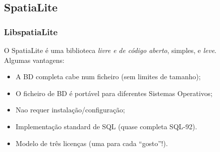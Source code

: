 \documentclass[hyperref={pdfpagelabels=true}]{beamer}
\begin{document}
\subsection{SpatiaLite}
\begin{frame}
\frametitle{LibspatiaLite}
O SpatiaLite \'{e} uma biblioteca \textit{livre e de c\'{o}digo aberto}, simples, e \textit{leve}.\\
Algumas vantagens:
    \begin{itemize}
      \item<2-> A BD completa cabe num ficheiro (sem limites de tamanho);
      \item<3-> O ficheiro de BD \'{e} port\'{a}vel para diferentes Sistemas Operativos;
      \item<4-> Nao requer instala\c{c}\~{a}o/configura\c{c}\~{a}o;
      \item<5-> Implementa\c{c}\~{a}o standard de SQL (quase completa SQL-92).      
      \item<6-> Modelo de tr\^{e}s licen\c{c}as (uma para cada ``gosto''!).      
    \end{itemize}
\end{frame}
\end{document}
